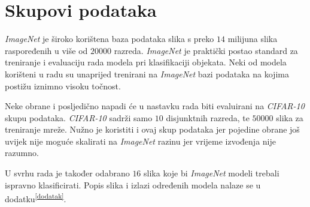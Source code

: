 \documentclass[utf8, diplomski]{fer}
\begin{document}
\section{Skupovi podataka}
\textit{ImageNet}\citep{ILSVRC15} je široko korištena baza podataka slika s preko $14$ milijuna slika raspoređenih u više od $20000$ razreda. \textit{ImageNet} je praktički postao standard za treniranje i evaluaciju rada modela pri klasifikaciji objekata. Neki od modela korišteni u radu su unaprijed trenirani na \textit{ImageNet} bazi podataka na kojima postižu iznimno visoku točnost.
\par
Neke obrane i posljedično napadi će u nastavku rada biti evaluirani na \textit{CIFAR-10}\citep{cifar10} skupu podataka. \textit{CIFAR-10} sadrži samo $10$ disjunktnih razreda, te $50000$ slika za treniranje mreže. Nužno je koristiti i ovaj skup podataka jer pojedine obrane još uvijek nije moguće skalirati na \textit{ImageNet} razinu jer vrijeme izvođenja nije razumno.
\par
U svrhu rada je također odabrano $16$ slika koje bi \textit{ImageNet} modeli trebali ispravno klasificirati. Popis slika i izlazi određenih modela nalaze se u dodatku\textsuperscript{\ref{dodatak}}.
\end{document}
